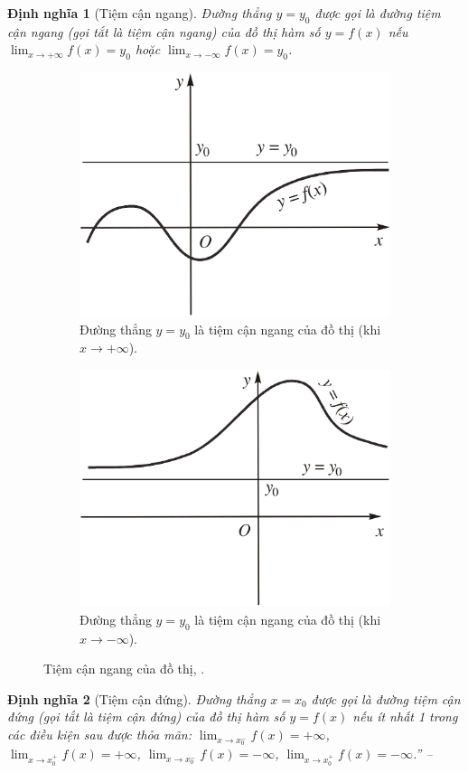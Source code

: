\documentclass[oneside]{book}
\numberwithin{equation}{section}
\newtheorem{dinhnghia}{Định nghĩa}[section]
\begin{document}
\begin{dinhnghia}[Tiệm cận ngang]
	Đường thẳng $y = y_0$ được gọi là \emph{đường tiệm cận ngang} (gọi tắt là \emph{tiệm cận ngang}) của đồ thị hàm số $y = f(x)$ nếu $\lim_{x\to+\infty} f(x) = y_0$ hoặc $\lim_{x\to-\infty} f(x) = y_0$.
\end{dinhnghia}

\begin{figure}[H]
	\centering
	\begin{subfigure}{.5\textwidth}
		\centering
		\includegraphics[width=.5\linewidth]{tiem_can_ngang_a}
		\caption{Đường thẳng $y = y_0$ là tiệm cận ngang của đồ thị (khi $x\to+\infty$).}
	\end{subfigure}%
	\begin{subfigure}{.5\textwidth}
		\centering
		\includegraphics[width=.5\linewidth]{tiem_can_ngang_b}
		\caption{Đường thẳng $y = y_0$ là tiệm cận ngang của đồ thị (khi $x\to-\infty$).}
	\end{subfigure}
	\caption{Tiệm cận ngang của đồ thị, \cite[Hình 1.7, p. 29]{SGK_Toan_12_giai_tich_nang_cao}.}
	\label{fig:tiem_can_ngang}
\end{figure}

\begin{dinhnghia}[Tiệm cận đứng]
	Đường thẳng $x = x_0$ được gọi là \emph{đường tiệm cận đứng} (gọi tắt là \emph{tiệm cận đứng}) của đồ thị hàm số $y = f(x)$ nếu ít nhất 1 trong các điều kiện sau được thỏa mãn: $\lim_{x\to x_0^-} f(x) = +\infty$, $\lim_{x\to x_0^+} f(x) = +\infty$, $\lim_{x\to x_0^-} f(x) = -\infty$, $\lim_{x\to x_0^+} f(x) = -\infty$.'' -- \cite[pp. 28--30]{SGK_Toan_12_giai_tich_nang_cao}
\end{dinhnghia}
\end{document}
